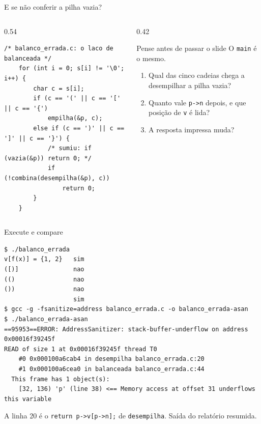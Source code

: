 \documentclass[aspectratio=169]{beamer}
\begin{document}
\begin{frame}[fragile]{E se não conferir a pilha vazia?}
  \begin{columns}[c]
    \begin{column}{0.54\textwidth}
\begin{lstlisting}[style=tinyC]
/* balanco_errada.c: o laco de balanceada */
    for (int i = 0; s[i] != '\0'; i++) {
        char c = s[i];
        if (c == '(' || c == '[' || c == '{')
            empilha(&p, c);
        else if (c == ')' || c == ']' || c == '}') {
            /* sumiu: if (vazia(&p)) return 0; */
            if (!combina(desempilha(&p), c))
                return 0;
        }
    }
\end{lstlisting}
    \end{column}
    \begin{column}{0.42\textwidth}
      \begin{block}{Pense antes de passar o slide}
        \small O \texttt{main} é o mesmo.
        \begin{enumerate}
          \item Qual das cinco cadeias chega a desempilhar a pilha vazia?
          \item Quanto vale \texttt{p->n} depois, e que posição de
            \texttt{v} é lida?
          \item A resposta impressa muda?
        \end{enumerate}
      \end{block}
    \end{column}
  \end{columns}
\end{frame}

\begin{frame}[fragile]{Execute e compare}
\begin{lstlisting}[style=shellStyle]
$ ./balanco_errada
v[f(x)] = {1, 2}   sim
([)]               nao
(()                nao
())                nao
                   sim
$ gcc -g -fsanitize=address balanco_errada.c -o balanco_errada-asan
$ ./balanco_errada-asan
==95953==ERROR: AddressSanitizer: stack-buffer-underflow on address 0x00016f39245f
READ of size 1 at 0x00016f39245f thread T0
    #0 0x000100a6cab4 in desempilha balanco_errada.c:20
    #1 0x000100a6cea0 in balanceada balanco_errada.c:44
  This frame has 1 object(s):
    [32, 136) 'p' (line 38) <== Memory access at offset 31 underflows this variable
\end{lstlisting}
  \begin{center}
    \scriptsize\textcolor{UFSGray}{A linha 20 é o \texttt{return p->v[p->n];}
    de \texttt{desempilha}. Saída do relatório resumida.}
  \end{center}
\end{frame}
\end{document}

